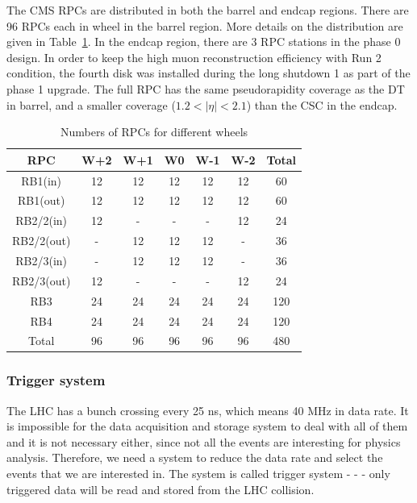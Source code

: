 The CMS RPCs are distributed in both the barrel and endcap regions. There are 96 RPCs each in wheel in the barrel region. More details on the distribution are given in Table~\ref{tab:c3cmsrpc}. In the endcap region, there are 3 RPC stations in the phase 0 design. In order to keep the high muon reconstruction efficiency with Run 2 condition, the fourth disk was installed during the long shutdown 1 as part of the phase 1 upgrade. The full RPC has the same pseudorapidity coverage as the DT in barrel, and a smaller coverage ($1.2<|\eta|<2.1$) than the CSC in the endcap.

\begin{table}[htbp]
\fontsize{10 pt}{1.2 em}
\selectfont
\begin{centering}
\caption{\label{tab:c3cmsrpc} Numbers of RPCs for different wheels}
\hspace*{-4ex}
\begin{tabular}{|c|c|c|c|c|c|c|}
\hline
 RPC &  W+2 & W+1 & W0 & W-1 & W-2 & Total \\
\hline
 RB1(in) & 12 & 12 & 12 & 12 & 12 & 60 \\
\hline
 RB1(out) & 12 & 12 & 12 & 12 & 12 & 60 \\
\hline
 RB2/2(in) & 12 & - & - & - & 12 & 24 \\
\hline
 RB2/2(out) & - & 12 & 12 & 12 & - & 36 \\
\hline
 RB2/3(in) & - & 12 & 12 & 12 & - & 36 \\
\hline
 RB2/3(out) & 12 & - & - & - & 12 & 24 \\
\hline
 RB3 & 24 & 24 & 24 & 24 & 24 & 120 \\
\hline
 RB4 & 24 & 24 & 24 & 24 & 24 & 120 \\
\hline
 Total & 96 & 96 & 96 & 96 & 96 & 480 \\
\hline
\end{tabular}
\par\end{centering}
\end{table}

\subsubsection{Trigger system}

The LHC has a bunch crossing every 25 ns, which means 40 MHz in data rate. It is impossible for the data acquisition and storage system to deal with all of them and it is not necessary either, since not all the events are interesting for physics analysis. Therefore, we need a system to reduce the data rate and select the events that we are interested in. The system is called trigger system - - - only triggered data will be read and stored from the LHC collision. 


